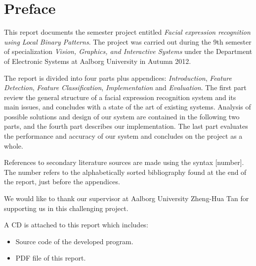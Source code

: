 \thispagestyle{plain}
\hypersetup{bookmarksdepth=-2} %
\chapter*{Preface}
\hypersetup{bookmarksdepth}%

\noindent This report documents the semester project entitled \textit{Facial expression recognition using Local Binary Patterns}. The project was carried out during the 9th semester of specialization \textit{Vision, Graphics, and Interactive Systems} under the Department of Electronic Systems at Aalborg University in Autumn 2012. 
\newline

\noindent The report is divided into four parts plus appendices: \textit{Introduction}, \textit{Feature Detection}, \textit{Feature Classification}, \textit{Implementation} and \textit{Evaluation}. The first part review the general structure of a facial expression recognition system and its main issues, and concludes with a state of the art of existing systems. Analysis of possible solutions and design of our system are contained in the following two parts, and the fourth part describes our implementation. The last part evaluates the performance and accuracy of our system and concludes on the project as a whole. 
\newline

\noindent References to secondary literature sources are made using the syntax [number]. The number refers to the alphabetically sorted bibliography found at the end of the report, just before the appendices.
\newline

\noindent We would like to thank our supervisor at Aalborg University Zheng-Hua Tan for supporting us in this challenging project. 
\newline

\noindent A CD is attached to this report which includes:
\begin{itemize}
\item Source code of the developed program.
\item PDF file of this report.
\end{itemize}

